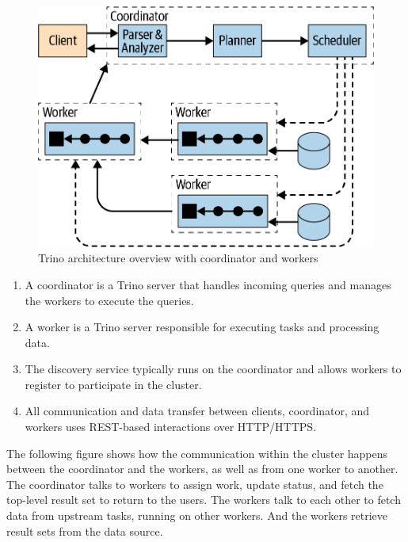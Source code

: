 \begin{figure}[htbp]
\centering
\includegraphics[width=\linewidth]{images/trino_architecture.png}
\caption{Trino architecture overview with coordinator and workers}\label{fig:trino-architecture}
\end{figure}

\begin{enumerate}
	\item A coordinator is a Trino server that handles incoming queries and manages the workers to execute the queries.
	\item A worker is a Trino server responsible for executing tasks and processing data.
	\item The discovery service typically runs on the coordinator and allows workers to register to participate in the cluster.
	\item All communication and data transfer between clients, coordinator, and workers uses REST-based interactions over HTTP/HTTPS.
\end{enumerate}

The following figure shows how the communication within the cluster happens between the coordinator and the workers, as well as from one worker to another. The coordinator talks to workers to assign work, update status, and fetch the top-level result set to return to the users. The workers talk to each other to fetch data from upstream tasks, running on other workers. And the workers retrieve result sets from the data source.


